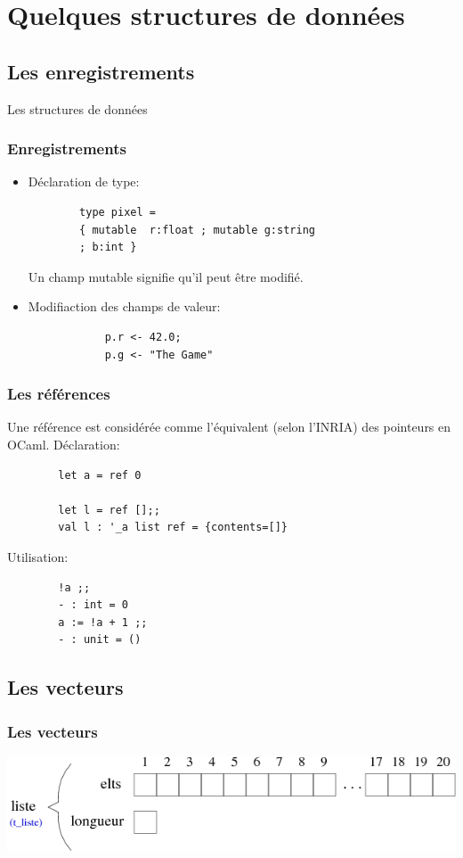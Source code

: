
\section{Quelques structures de données}
\subsection{Les enregistrements}

\begin{frame}
	\begin{center}
		\huge 
		Les structures de données
	\end{center}
\end{frame}


\begin{frame}[fragile]
	\frametitle{Enregistrements}
	\begin{itemize}
	\item Déclaration de type: 
		\begin{lstlisting}
		type pixel = 
		{ mutable  r:float ; mutable g:string 
		; b:int } 
		\end{lstlisting}
		Un champ mutable signifie qu'il peut être modifié.
	
	\item Modifiaction des champs de valeur:
		\begin{lstlisting}
			p.r <- 42.0;
			p.g <- "The Game"
		\end{lstlisting}
	\end{itemize}
\end{frame}


\begin{frame}[fragile]
	\frametitle{Les références}
	Une référence est considérée comme l'équivalent (selon l'INRIA) des pointeurs en OCaml.
	Déclaration:
	\begin{lstlisting}
		let a = ref 0

		let l = ref [];;
		val l : '_a list ref = {contents=[]}
	\end{lstlisting}
	Utilisation:
	\begin{lstlisting}
		!a ;;
		- : int = 0
		a := !a + 1 ;;
		- : unit = ()
	\end{lstlisting}

\end{frame}

\subsection{Les vecteurs}

\begin{frame}
	\frametitle{Les vecteurs}
	\includegraphics[scale=0.5]{pics/vect.png}
\end{frame}

